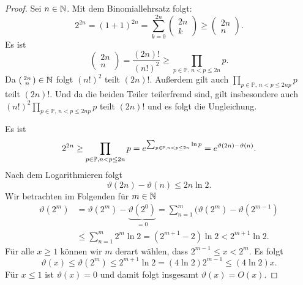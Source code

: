 \documentclass{mywork}
\renewcommand{\theta}{\vartheta}
\begin{document}
\begin{proof}
Sei $ n\in \mathbb{N} $. Mit dem Binomiallehrsatz folgt:
\[
2^{2n} = (1+1)^{2n}=\sum_{k=0}^{2n} \begin{pmatrix} 2n \\ k \end{pmatrix} \ge \begin{pmatrix} 2n \\ n \end{pmatrix}.
\]
Es ist 
\[
\begin{pmatrix}2n \\ n \end{pmatrix} = \frac{(2n)!}{(n!)^2}\ge \prod_{p \in \mathbb P, \, n<p\le 2n} p.
\]
Da $ \begin{psmallmatrix} 2n \\ n \end{psmallmatrix} \in \mathbb{N} $ folgt $ (n!)^2$ teilt $ (2n)! $. Außerdem gilt auch $ \prod_{p \in \mathbb P, \, n<p\le 2n p} p$ teilt $(2n)!$. Und da die beiden Teiler teilerfremd sind, gilt insbesondere auch $ (n!)^2 \prod_{p \in \mathbb P, \, n<p\le 2n p} p$ teilt $(2n)! $ und es folgt die Ungleichung.

Es ist
\[
2^{2n}\ge \prod_{p\in \P, n<p\le 2n} p =e^{\sum_{p\in \P, n< p \le 2n} \ln p}=e^{\theta(2n)-\theta(n)}.
\]
Nach dem Logarithmieren folgt
\[
\theta(2n)-\theta(n)\le 2n \ln 2.
\]
Wir betrachten im Folgenden für $ m\in \mathbb{N} $
\begin{align*}
\theta(2^m)&=\theta(2^m)-\underbrace{\theta(2^0)}_{=0}=\sum_{n=1}^m (\theta(2^m)-\theta(2^{m-1}) \\ 
&\le \sum_{n=1}^m 2^m \ln 2 = (2^{m+1}-2)\ln 2< 2^{m+1} \ln 2.
\end{align*}
Für alle $ x\ge 1 $ können wir $m$ derart wählen, dass $ 2^{m-1} \le x < 2^m $. Es folgt
\[
\theta(x) \le \theta(2^m) \le 2^{m+1}\ln 2 = (4 \ln 2)2^{m-1} \le (4 \ln 2) x.
\]
Für $ x\le 1 $ ist $ \theta(x)=0 $ und damit folgt insgesamt $ \theta(x)=O(x) $.
\end{proof}
\end{document}
